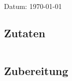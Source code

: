 \documentclass[fontsize=15pt,paper=a4]{scrdoc}
\begin{document}
\section*{}
\vspace{-15pt}
\begin{center}
    \scriptsize Datum: \today
\end{center}

\subsection*{Zutaten}
\begin{tabularx}{\textwidth}{XX}
    
\end{tabularx}

\subsection*{Zubereitung}
\begin{enumerate}
    
\end{enumerate}
\end{document}
